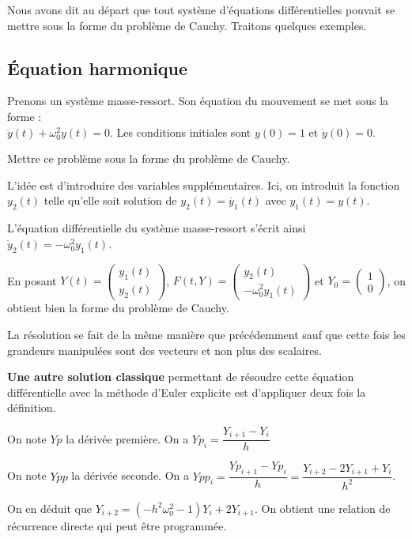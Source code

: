 \documentclass[10pt]{article}
\begin{document}
Nous avons dit au départ que tout système d'équations différentielles pouvait se mettre sous la forme du problème de Cauchy. Traitons quelques exemples.

\subsection{\'Equation harmonique}
Prenons un système masse-ressort. Son équation du mouvement se met sous la forme : \\$\ddot y(t) + \omega_0^2 y(t) = 0$. Les conditions initiales sont $y(0)=1$ et $\dot y(0)=0$.

  {Mettre ce problème sous la forme du problème de Cauchy.}

L'idée est d'introduire des variables supplémentaires. Ici, on introduit la fonction $y_2(t)$ telle qu'elle soit solution de $y_2(t)=\dot{y_1}(t)$ avec $y_1(t)=y(t)$.

L'équation différentielle du système masse-ressort s'écrit ainsi $\dot y_2(t)= - \omega_0^2 y_1(t)$.

En posant $  {Y}(t)=\left(\begin{matrix}
y_1(t)\\y_2(t)
\end{matrix}\right)$, $  {F}(t,  {Y})=\left(\begin{matrix}
y_2(t)\\-\omega_0^2 y_1(t)
\end{matrix}\right)$ et $  {Y}_0=\left(\begin{matrix}
1\\0
\end{matrix}\right)$, on obtient bien la forme du problème de Cauchy. 


La résolution se fait de la même manière que précédemment sauf que cette fois les grandeurs manipulées sont des vecteurs et non plus des scalaires. 

\bigskip
\textbf{Une autre solution classique} permettant de résoudre cette équation différentielle avec la méthode d'Euler explicite est d'appliquer deux fois la définition.

On note $Yp$ la dérivée première. On a $Yp_{i} =\dfrac{Y_{i+1}-Y_i}{h}$

On note $Ypp$ la dérivée seconde. On a $Ypp_{i} =\dfrac{Yp_{i+1}-Yp_i}{h} = \dfrac{Y_{i+2}-2Y_{i+1}+Y_i}{h^2}$.

On en déduit que $Y_{i+2} = (-h^2\omega_0^2 - 1 )Y_i + 2 Y_{i+1}$. On obtient une relation de récurrence directe qui peut être programmée.
\end{document}
